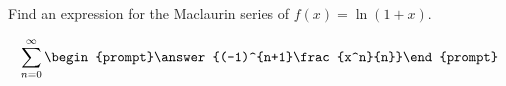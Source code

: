 \documentclass{ximera}
\author{Gregory Hartman \and Matthew Carr}
\begin{document}
\begin{exercise}






Find an expression for the Maclaurin series of $f(x)=\ln(1+x)$.

\[
\sum_{n=0}^{\infty}\begin{prompt}\answer{(-1)^{n+1}\frac{x^n}{n}}\end{prompt}
\]

\end{exercise}
\end{document}
